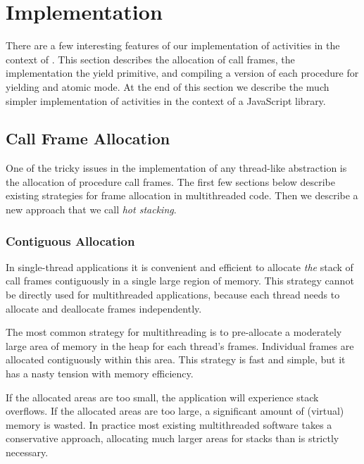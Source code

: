 \documentclass[9pt,preprint]{sigplanconf}
\begin{document}
\section{Implementation}

There are a few interesting features of our implementation of activities in the context of \charcoal{}.
This section describes the allocation of call frames, the implementation the yield primitive, and compiling a version of each procedure for yielding and atomic mode.
At the end of this section we describe the much simpler implementation of activities in the context of a JavaScript library.

\subsection{Call Frame Allocation}

One of the tricky issues in the implementation of any thread-like abstraction is the allocation of procedure call frames.
The first few sections below describe existing strategies for frame allocation in multithreaded code.
Then we describe a new approach that we call \emph{hot stacking}.

\subsubsection{Contiguous Allocation}

In single-thread applications it is convenient and efficient to allocate \emph{the} stack of call frames contiguously in a single large region of memory.
This strategy cannot be directly used for multithreaded applications, because each thread needs to allocate and deallocate frames independently.

The most common strategy for multithreading is to pre-allocate a moderately large area of memory in the heap for each thread's frames.
Individual frames are allocated contiguously within this area.
This strategy is fast and simple, but it has a nasty tension with memory efficiency.

If the allocated areas are too small, the application will experience stack overflows.
If the allocated areas are too large, a significant amount of (virtual) memory is wasted.
In practice most existing multithreaded software takes a conservative approach, allocating much larger areas for stacks than is strictly necessary.
\end{document}
